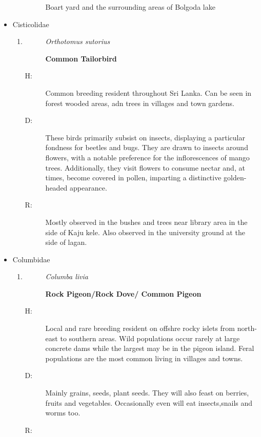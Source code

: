 \begin{itemize}
\begin{enumerate}
\begin{description}
Boart yard and the surrounding areas of Bolgoda lake%
\end{description}%
\end{enumerate}%
\item%
Cisticolidae%
\begin{enumerate}%
\item%
\begin{description}%
\item[]%
\textit{Orthotomus sutorius}%
\item[]%
\textbf{Common Tailorbird}%
\end{description}%
\begin{description}%
\item[H: ]%
Common breeding resident throughout Sri Lanka. Can be seen in forest wooded areas, adn trees in villages and town gardens.%
\item[D: ]%
These birds primarily subsist on insects, displaying a particular fondness for beetles and bugs. They are drawn to insects around flowers, with a notable preference for the inflorescences of mango trees. Additionally, they visit flowers to consume nectar and, at times, become covered in pollen, imparting a distinctive golden{-}headed appearance.%
\item[R: ]%
Mostly observed in the bushes and trees near library area in the side of Kaju kele. Also observed in the university ground at the side of lagan.%
\end{description}%
\end{enumerate}%
\item%
Columbidae%
\begin{enumerate}%
\item%
\begin{description}%
\item[]%
\textit{Columba livia}%
\item[]%
\textbf{Rock Pigeon/Rock Dove/ Common Pigeon}%
\end{description}%
\begin{description}%
\item[H: ]%
Local and rare breeding resident on offshre rocky islets from north{-}east to southern areas. Wild populations occur rarely at large concrete dams while the largest may be in the pigeon island. Feral populations are the most common living in villages and towns. %
\item[D: ]%
Mainly grains, seeds, plant seeds. They will also feast on berries, fruits and vegetables. Occasionally even will eat insects,snails and worms too.%
\item[R: ]%

\end{description}
\end{enumerate}
\end{itemize}
